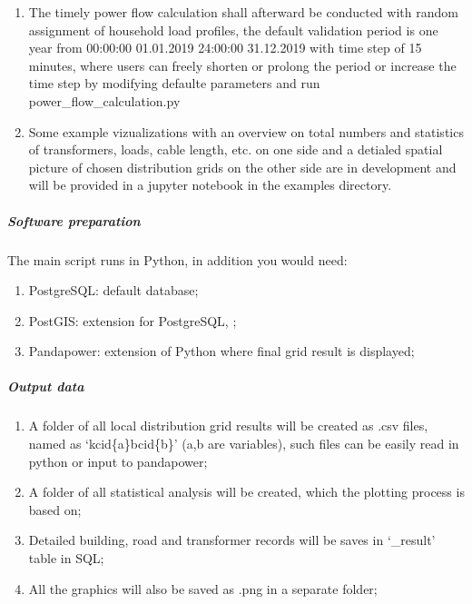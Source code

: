 \documentclass[letterpaper,10pt,english]{sphinxmanual}
\begin{document}
\begin{enumerate}
\item {} 
\sphinxAtStartPar
The timely power flow calculation shall afterward be conducted with random assignment of household load profiles, the
default validation period is one year from 00:00:00 01.01.2019 \sphinxhyphen{} 24:00:00 31.12.2019 with time step of 15 minutes,
where users can freely shorten or prolong the period or increase the time step by modifying defaulte parameters and
run power\_flow\_calculation.py

\item {} 
\sphinxAtStartPar
Some example vizualizations with an overview on total numbers and statistics of transformers, loads, cable length,
etc. on one side and a detialed spatial picture of chosen distribution grids on the other side are in development and
will be provided in a jupyter notebook in the examples directory.

\end{enumerate}


\subparagraph{Software preparation}
\label{\detokenize{grid_generation/main_workflow/main_workflow:software-preparation}}
\sphinxAtStartPar
The main script runs in Python, in addition you would need:
\begin{enumerate}
%
\item {} 
\sphinxAtStartPar
PostgreSQL: default database;

\item {} 
\sphinxAtStartPar
PostGIS: extension for PostgreSQL, ;

\item {} 
\sphinxAtStartPar
Pandapower: extension of Python where final grid result is displayed;

\end{enumerate}


\subparagraph{Output data}
\label{\detokenize{grid_generation/main_workflow/main_workflow:output-data}}\begin{enumerate}
%
\item {} 
\sphinxAtStartPar
A folder of all local distribution grid results will be created as .csv files, named as ‘kcid\{a\}bcid\{b\}’ (a,b are
variables), such files can be easily read in python or input to pandapower;

\item {} 
\sphinxAtStartPar
A folder of all statistical analysis will be created, which the plotting process is based on;

\item {} 
\sphinxAtStartPar
Detailed building, road and transformer records will be saves in ‘\_result’ table in SQL;

\item {} 
\sphinxAtStartPar
All the graphics will also be saved as .png in a separate folder;

\end{enumerate}
\end{document}
